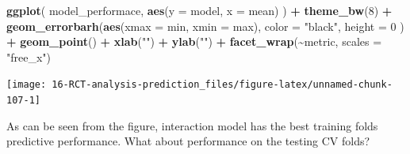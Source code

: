 \documentclass[
]{book}
\newenvironment{Shaded}{\begin{snugshade}}{\end{snugshade}}
\newcommand{\DataTypeTok}[1]{\textcolor[rgb]{0.13,0.29,0.53}{#1}}
\newcommand{\DecValTok}[1]{\textcolor[rgb]{0.00,0.00,0.81}{#1}}
\newcommand{\KeywordTok}[1]{\textcolor[rgb]{0.13,0.29,0.53}{\textbf{#1}}}
\newcommand{\NormalTok}[1]{#1}
\newcommand{\OperatorTok}[1]{\textcolor[rgb]{0.81,0.36,0.00}{\textbf{#1}}}
\newcommand{\StringTok}[1]{\textcolor[rgb]{0.31,0.60,0.02}{#1}}
\begin{document}
\begin{Shaded}
\begin{Highlighting}[]
\KeywordTok{ggplot}\NormalTok{(}
\NormalTok{  model\_performace,}
  \KeywordTok{aes}\NormalTok{(}\DataTypeTok{y =}\NormalTok{ model, }\DataTypeTok{x =}\NormalTok{ mean)}
\NormalTok{) }\OperatorTok{+}
\StringTok{  }\KeywordTok{theme\_bw}\NormalTok{(}\DecValTok{8}\NormalTok{) }\OperatorTok{+}
\StringTok{  }\KeywordTok{geom\_errorbarh}\NormalTok{(}\KeywordTok{aes}\NormalTok{(}\DataTypeTok{xmax =}\NormalTok{ min, }\DataTypeTok{xmin =}\NormalTok{ max),}
    \DataTypeTok{color =} \StringTok{"black"}\NormalTok{,}
    \DataTypeTok{height =} \DecValTok{0}
\NormalTok{  ) }\OperatorTok{+}
\StringTok{  }\KeywordTok{geom\_point}\NormalTok{() }\OperatorTok{+}
\StringTok{  }\KeywordTok{xlab}\NormalTok{(}\StringTok{""}\NormalTok{) }\OperatorTok{+}
\StringTok{  }\KeywordTok{ylab}\NormalTok{(}\StringTok{""}\NormalTok{) }\OperatorTok{+}
\StringTok{  }\KeywordTok{facet\_wrap}\NormalTok{(}\OperatorTok{\textasciitilde{}}\NormalTok{metric, }\DataTypeTok{scales =} \StringTok{"free\_x"}\NormalTok{)}
\end{Highlighting}
\end{Shaded}

\begin{center}\texttt{[image: 16-RCT-analysis-prediction\_files/figure-latex/unnamed-chunk-107-1]} \end{center}

As can be seen from the figure, interaction model has the best training folds predictive performance. What about performance on the testing CV folds?
\end{document}
